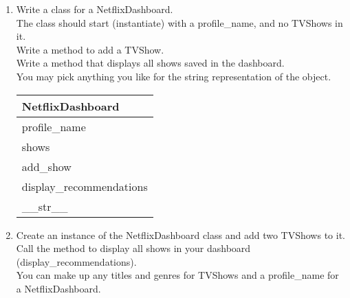 \documentclass{article}
\begin{document}
\begin{enumerate}
\begin{enumerate}
		\item
			Write a class for a NetflixDashboard. \\
			The class should start (instantiate) with a profile\_name, and no TVShows in it. \\ 
			Write a method to add a TVShow.\\
			Write a method that displays all shows saved in the dashboard.\\
			You may pick anything you like for the string representation of the object.
	
			\begin{flushright}
			\begin{tabular}{|l|}
				\hline
				NetflixDashboard\\ \hline  	%
				profile\_name \\ shows\\ \hline		%
				add\_show \\ display\_recommendations \\ \_\_str\_\_ \\ \hline		%
			\end{tabular}
			\end{flushright}

		\item
			Create an instance of the NetflixDashboard class and add two TVShows to it.\\
			Call the method to display all shows in your dashboard (display\_recommendations).\\
			You can make up any titles and genres for TVShows and a profile\_name for a NetflixDashboard.\\
	\end{enumerate}
\pagebreak




\end{enumerate}
\end{document}
